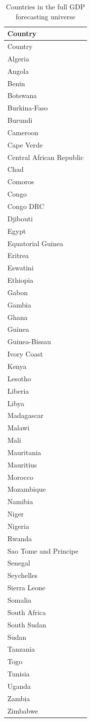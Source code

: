 \begin{longtable}{l}
\caption{Countries in the full GDP forecasting universe}\label{tab:supp_countries}\\
\toprule Country \\
\midrule\endfirsthead
\toprule Country \\
\midrule\endhead
Algeria \\
Angola \\
Benin \\
Botswana \\
Burkina-Faso \\
Burundi \\
Cameroon \\
Cape Verde \\
Central African Republic \\
Chad \\
Comoros \\
Congo \\
Congo DRC \\
Djibouti \\
Egypt \\
Equatorial Guinea \\
Eritrea \\
Eswatini \\
Ethiopia \\
Gabon \\
Gambia \\
Ghana \\
Guinea \\
Guinea-Bissau \\
Ivory Coast \\
Kenya \\
Lesotho \\
Liberia \\
Libya \\
Madagascar \\
Malawi \\
Mali \\
Mauritania \\
Mauritius \\
Morocco \\
Mozambique \\
Namibia \\
Niger \\
Nigeria \\
Rwanda \\
Sao Tome and Principe \\
Senegal \\
Seychelles \\
Sierra Leone \\
Somalia \\
South Africa \\
South Sudan \\
Sudan \\
Tanzania \\
Togo \\
Tunisia \\
Uganda \\
Zambia \\
Zimbabwe \\
\bottomrule
\end{longtable}
